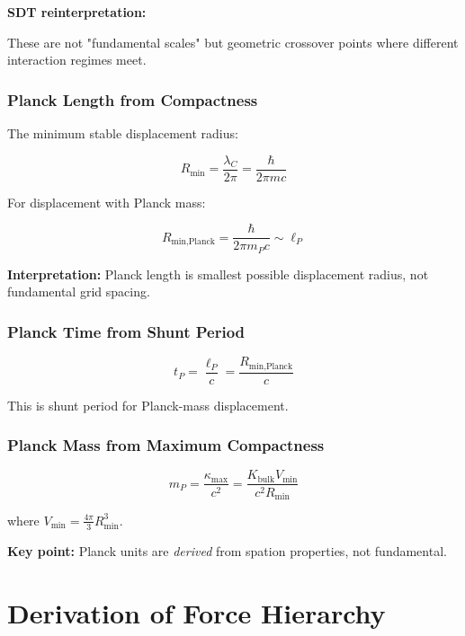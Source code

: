 \textbf{SDT reinterpretation:}

These are not "fundamental scales" but geometric crossover points where different interaction regimes meet.

\subsubsection{Planck Length from Compactness}

The minimum stable displacement radius:

\begin{equation}
R_{\text{min}} = \frac{\lambda_C}{2\pi} = \frac{\hbar}{2\pi mc}
\end{equation}

For displacement with Planck mass:

\begin{equation}
R_{\text{min,Planck}} = \frac{\hbar}{2\pi m_P c} \sim \ell_P
\end{equation}

\textbf{Interpretation:} Planck length is smallest possible displacement radius, not fundamental grid spacing.

\subsubsection{Planck Time from Shunt Period}

\begin{equation}
t_P = \frac{\ell_P}{c} = \frac{R_{\text{min,Planck}}}{c}
\end{equation}

This is shunt period for Planck-mass displacement.

\subsubsection{Planck Mass from Maximum Compactness}

\begin{equation}
m_P = \frac{\kappa_{\text{max}}}{c^2} = \frac{K_{\text{bulk}} V_{\text{min}}}{c^2 R_{\text{min}}}
\end{equation}

where $V_{\text{min}} = \frac{4\pi}{3} R_{\text{min}}^3$.

\textbf{Key point:} Planck units are \emph{derived} from spation properties, not fundamental.

\section{Derivation of Force Hierarchy}

